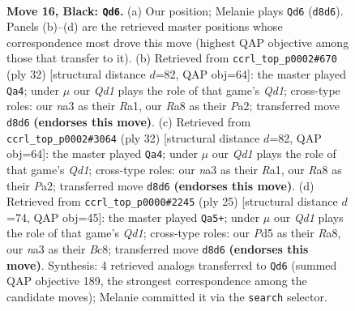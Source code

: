 \documentclass[11pt]{article}
\begin{document}
\clearpage

\begin{figure}[p]\centering
\begin{subfigure}{0.46\textwidth}\centering
\resizebox{\linewidth}{!}{%
\newchessgame
\chessboard[
  setfen={r1bqr1k1/1pp2p1p/2n2b2/p2p4/3P4/N3P1P1/PP3P2/RNBQRK2 b - - 3 16},
  showmover=false,
  pgfstyle=straightmove, color=movearrow, markmove={d8-d6}
]}
\caption{}
\end{subfigure}\hfill
\begin{subfigure}{0.46\textwidth}\centering
\resizebox{\linewidth}{!}{%
\newchessgame
\chessboard[
  setfen={2r2rk1/pb2qpp1/1pn1pn1p/8/3P1B2/2N3P1/PP3PBP/R2QR1K1 w - - 0 17},
  showmover=false,
  pgfstyle=straightmove, color=movearrow, markmove={d1-a4}
]}
\caption{}
\end{subfigure}
\\[4pt]
\begin{subfigure}{0.46\textwidth}\centering
\resizebox{\linewidth}{!}{%
\newchessgame
\chessboard[
  setfen={2r2rk1/pb2qpp1/1pn1pn1p/8/3P1B2/2N3P1/PP3PBP/R2QR1K1 w - - 0 17},
  showmover=false,
  pgfstyle=straightmove, color=movearrow, markmove={d1-a4}
]}
\caption{}
\end{subfigure}\hfill
\begin{subfigure}{0.46\textwidth}\centering
\resizebox{\linewidth}{!}{%
\newchessgame
\chessboard[
  setfen={r1bq1rk1/pp4pp/2nbp3/3p4/3P4/P4NP1/1P3PBP/R1BQK2R b KQ - 1 13},
  showmover=false,
  pgfstyle=straightmove, color=movearrow, markmove={d8-a5}
]}
\caption{}
\end{subfigure}
\caption{\textbf{Move 16, Black: \texttt{Qd6}.} (a) Our position; Melanie plays \texttt{Qd6} (\texttt{d8d6}). Panels (b)--(d) are the retrieved master positions whose correspondence most drove this move (highest QAP objective among those that transfer to it). (b) Retrieved from \texttt{ccrl\_top\_p0002\#670} (ply 32) [structural distance $d$=82, QAP obj=64]: the master played \texttt{Qa4}; under $\mu$ our \emph{Qd1} plays the role of that game's \emph{Qd1}; cross-type roles: our \emph{n}a3 as their \emph{R}a1, our \emph{R}a8 as their \emph{P}a2; transferred move \texttt{d8d6} \textbf{(endorses this move)}. (c) Retrieved from \texttt{ccrl\_top\_p0002\#3064} (ply 32) [structural distance $d$=82, QAP obj=64]: the master played \texttt{Qa4}; under $\mu$ our \emph{Qd1} plays the role of that game's \emph{Qd1}; cross-type roles: our \emph{n}a3 as their \emph{R}a1, our \emph{R}a8 as their \emph{P}a2; transferred move \texttt{d8d6} \textbf{(endorses this move)}. (d) Retrieved from \texttt{ccrl\_top\_p0000\#2245} (ply 25) [structural distance $d$=74, QAP obj=45]: the master played \texttt{Qa5+}; under $\mu$ our \emph{Qd1} plays the role of that game's \emph{Qd1}; cross-type roles: our \emph{P}d5 as their \emph{R}a8, our \emph{n}a3 as their \emph{B}c8; transferred move \texttt{d8d6} \textbf{(endorses this move)}. Synthesis: 4 retrieved analogs transferred to \texttt{Qd6} (summed QAP objective 189, the strongest correspondence among the candidate moves); Melanie committed it via the \texttt{search} selector.}
\label{fig:thought-m31}
\end{figure}
\end{document}
